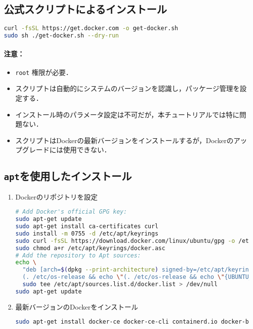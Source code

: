 \subsection{公式スクリプトによるインストール}
\begin{lstlisting}[language=bash]
curl -fsSL https://get.docker.com -o get-docker.sh
sudo sh ./get-docker.sh --dry-run
\end{lstlisting}
\paragraph{注意：}
\begin{itemize}
    \item \texttt{root} 権限が必要．
    \item スクリプトは自動的にシステムのバージョンを認識し，パッケージ管理を設定する．
    \item インストール時のパラメータ設定は不可だが，本チュートリアルでは特に問題ない．
    \item スクリプトはDockerの最新バージョンをインストールするが，Dockerのアップグレードには使用できない．
\end{itemize}
\subsection{\texttt{apt}を使用したインストール}
\begin{enumerate}
    \item Dockerのリポジトリを設定
\begin{lstlisting}[language=bash]
# Add Docker's official GPG key:
sudo apt-get update
sudo apt-get install ca-certificates curl
sudo install -m 0755 -d /etc/apt/keyrings
sudo curl -fsSL https://download.docker.com/linux/ubuntu/gpg -o /etc/apt/keyrings/docker.asc
sudo chmod a+r /etc/apt/keyrings/docker.asc
# Add the repository to Apt sources:
echo \
  "deb [arch=$(dpkg --print-architecture) signed-by=/etc/apt/keyrings/docker.asc] https://download.docker.com/linux/ubuntu \
  (. /etc/os-release && echo \"(. /etc/os-release && echo \"{UBUNTU_CODENAME:-$VERSION_CODENAME}\") stable" | \
  sudo tee /etc/apt/sources.list.d/docker.list > /dev/null
sudo apt-get update
\end{lstlisting}
    \item 最新バージョンのDockerをインストール
\begin{lstlisting}[language=bash]
sudo apt-get install docker-ce docker-ce-cli containerd.io docker-buildx-plugin docker-compose-plugin
\end{lstlisting}
\end{enumerate}

